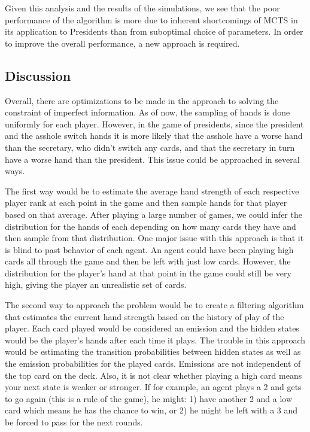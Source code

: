 \documentclass[11pt]{article}
\begin{document}
Given this analysis and the results of the simulations, we see that the poor performance of the algorithm is more due to inherent shortcomings of MCTS in its application to Presidents than from suboptimal choice of parameters. In order to improve the overall performance, a new approach is required.


 
\subsection{Discussion}
Overall, there are optimizations to be made in the approach to solving the constraint of imperfect information. As of now, the sampling of hands is done uniformly for each player. However, in the game of presidents, since the president and the asshole switch hands it is more likely that the asshole have a worse hand than the secretary, who didn't switch any cards, and that the secretary in turn have a worse hand than the president. This issue could be approached in several ways.

The first way would be to estimate the average hand strength of each respective player rank at each point in the game and then sample hands for that player based on that average. After playing a large number of games, we could infer the distribution for the hands of each depending on how many cards they have and then sample from that distribution. One major issue with this approach is that it is blind to past behavior of each agent. An agent could have been playing high cards all through the game and then be left with just low cards. However, the distribution for the player's hand at that point in the game could still be very high, giving the player an unrealistic set of cards.

 The second way to approach the problem would be to create a filtering algorithm that estimates the current hand strength based on the history of play of the player. Each card played would be considered an emission and the hidden states would be the player's hands after each time it plays. The trouble in this approach would be estimating the transition probabilities between hidden states as well as the emission probabilities for the played cards. Emissions are not independent of the top card on the deck. Also, it is not clear whether playing a high card means your next state is weaker or stronger. If for example, an agent plays a 2 and gets to go again (this is a rule of the game), he might: 1) have another 2 and a low card which means he has the chance to win, or 2) he might be left with a 3 and be forced to pass for the next rounds.
\end{document}
